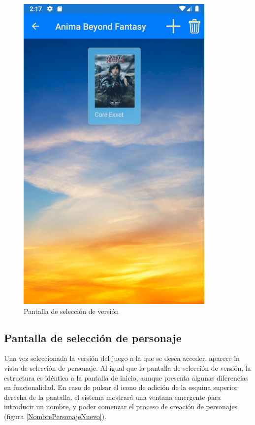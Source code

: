 \begin{figure}[H]
    \centering
    \includegraphics[scale=0.3]{Figures/Capturas/SeleccionVersion.png}
    \caption{Pantalla de selección de versión}
    \label{SeleccionVersion}    
\end{figure}

\subsection{Pantalla de selección de personaje}
Una vez seleccionada la versión del juego a la que se desea acceder, aparece la vista de selección de personaje.
Al igual que la pantalla de selección de versión, la estructura es idéntica a la pantalla de inicio, aunque presenta 
algunas diferencias en funcionalidad. En caso de pulsar el icono de adición de la esquina superior derecha de la pantalla, 
el sistema mostrará una ventana emergente para introducir un nombre, y poder comenzar el proceso de creación de personajes 
(figura \ref*{NombrePersonajeNuevo}).

